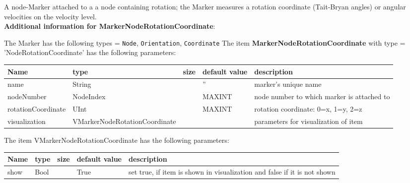 \label{sec:item:MarkerNodeRotationCoordinate}
A node-Marker attached to a a node containing rotation; the Marker measures a rotation coordinate (Tait-Bryan angles) or angular velocities on the velocity level.\vspace{12pt}
 \\{\bf Additional information for MarkerNodeRotationCoordinate}:
\bi
  \item The Marker has the following types = \texttt{Node}, \texttt{Orientation}, \texttt{Coordinate}
\ei
\vspace{12pt} \noindent The item {\bf MarkerNodeRotationCoordinate} with type = 'NodeRotationCoordinate' has the following parameters:\vspace{-1cm}\\ 
\begin{center}
  \footnotesize
  \begin{longtable}{| p{4.5cm} | p{2.5cm} | p{0.5cm} | p{2.5cm} | p{6cm} |}
    \hline
    \bf Name & \bf type & \bf size & \bf default value & \bf description \\ \hline
    name &     String &      &     '' &     marker's unique name\\ \hline
    nodeNumber &     NodeIndex &      &     MAXINT &     node number to which marker is attached to\\ \hline
    rotationCoordinate &     UInt &      &     MAXINT &     rotation coordinate: 0=x, 1=y, 2=z\\ \hline
    visualization & VMarkerNodeRotationCoordinate & & & parameters for visualization of item \\ \hline
	  \end{longtable}
	\end{center}
The item VMarkerNodeRotationCoordinate has the following parameters:\vspace{-1cm}\\ 
\begin{center}
  \footnotesize
  \begin{longtable}{| p{4.5cm} | p{2.5cm} | p{0.5cm} | p{2.5cm} | p{6cm} |}
    \hline
    \bf Name & \bf type & \bf size & \bf default value & \bf description \\ \hline
    show &     Bool &      &     True &     set true, if item is shown in visualization and false if it is not shown\\ \hline
	  \end{longtable}
	\end{center}
